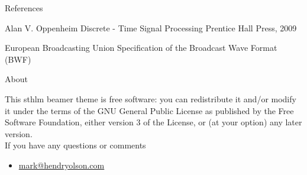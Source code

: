 \documentclass[newPxFont]{beamer}
\begin{document}
\begin{frame}{References}
	\begin{thebibliography}{10}

	\beamertemplatebookbibitems
	Alan V. Oppenheim
	\newblock Discrete - Time Signal Processing
	\newblock Prentice Hall Press, 2009

	\beamertemplatearticlebibitems
	European Broadcasting Union
	\newblock Specification of the Broadcast Wave Format (BWF)

  \end{thebibliography}
\end{frame}

%
%

\begin{frame}{About}

This sthlm beamer theme is free software: you can redistribute it and/or modify
it under the terms of the GNU General Public License as published by
the Free Software Foundation, either version 3 of the License, or
(at your option) any later version.\\

If you have any questions or comments
\begin{itemize}
	\item \url{mark@hendryolson.com}
\end{itemize}
\end{frame}
\end{document}
